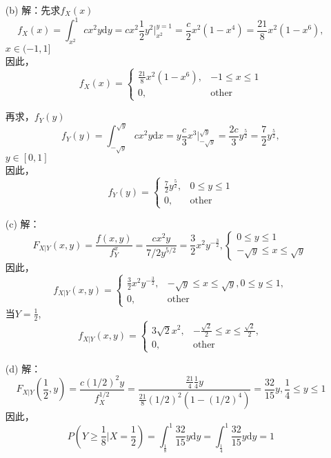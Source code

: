 \documentclass [12pt]{article}
\begin{document}
\begin{CJK*}{GBK}{kai}
\begin{enumerate}
  \item[(b)]  解：先求$f_{X}(x)$\\
  $$f_{X}(x)=\int_{x^2}^{1}cx^2y\mathrm{d}y
  =cx^2 \frac{1}{2}y^2\vert_{x^2}^{y=1}
  =\frac{c}{2}x^2(1-x^4)=\frac{21}{8}x^2(1-x^6), 
  $$
  $x \in (-1,1]$\\
  因此，
  $$f_{X}(x)=\begin{cases}
	\frac{21}{8}x^2(1-x^6), & \text{$-1 \le x \le 1$}\\
	0, & \text{other}
   \end{cases}$$
   
   再求，$f_{Y}(y)$
   $$f_{Y}(y)=\int_{-\sqrt{y}}^{\sqrt{y}} cx^2y\mathrm{d}x
  =y  \frac{c}{3}x^3\vert_{-\sqrt{y}}^{\sqrt{y}}
  =\frac{2c}{3}y^{\frac{5}{2}}=\frac{7}{2}y^{\frac{5}{2}}, 
  $$
  $y \in [0,1]$\\
  因此，
  $$f_{Y}(y)=\begin{cases}
	\frac{7}{2}y^{\frac{5}{2}},  & \text{$0 \le y \le 1$}\\
	0, & \text{other}
   \end{cases}$$

  \item[(c)]  解：
	$$F_{X|Y}(x,y)=\frac{f(x,y)}{f_{Y}^{x}}=\frac{cx^2y}{7/2y^{5/2}}=\frac{3}{2}x^2y^{-\frac{3}{2}}, 
	\begin{cases}
		\text{$0 \le y \le 1$}\\
		\text{$-\sqrt{y} \le x \le \sqrt{y}$}
   	\end{cases}
	$$
	因此，
	$$f_{X|Y}{(x,y)}=
	\begin{cases}
		\frac{3}{2}x^2y^{-\frac{3}{2}}, &	\text{$-\sqrt{y} \le x \le \sqrt{y}, 0 \le y \le 1$},\\
		0, & \text{other}
	\end{cases}
	$$
	当$Y=\frac{1}{2}$,$$f_{X|Y}{(x,y)}=
	\begin{cases}
		3\sqrt{2}x^2, &	\text{$-\frac{\sqrt{2}}{2} \le x \le \frac{\sqrt{2}}{2} $},\\
		0, & \text{other}
	\end{cases}
	$$
 
  \item[(d)]  解：
	$$F_{X|Y}(\frac{1}{2},y)
	=\frac{c(1/2)^2y}{f_{X}^{1/2}}
	=\frac{\frac{21}{4}\frac{1}{4}y}{\frac{21}{8}(1/2)^2(1-(1/2)^4)}
	=\frac{32}{15}y, \frac{1}{4} \le y \le 1 
	$$
	因此，$$P(Y \ge \frac{1}{8}| X=\frac{1}{2})
	=\int_{\frac{1}{8}}^{1} \frac{32}{15}y \mathrm{d}y
	=\int_{\frac{1}{4}}^{1} \frac{32}{15}y \mathrm{d}y
	=1
	$$



\end{enumerate}
\end{CJK*}
\end{document}
